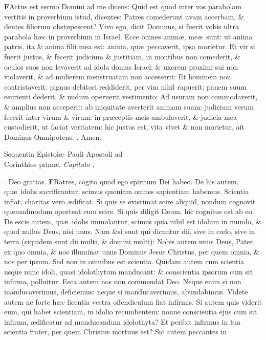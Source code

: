 \documentclass[letter,11pt]{book}
\makeatletter
\DeclareRobustCommand{\Rbar}{\vers@resp{0pt}{R}}
\newcommand{\vers@resp@sym}{\raisebox{0.2ex}{\rotatebox[origin=c]{-20}{$\m@th\rceil$}}}
\newcommand{\vers@resp}[2]{%
  {\ooalign{\hidewidth\kern#1\vers@resp@sym\hidewidth\cr#2\cr}}%
}%
\def\R{\color{Red} \Rbar . \color{black}}
\makeatother
\begin{document}
\begin{multicols*}{2}
\lettrine[lines=2]{\bfseries \color{Red} F}{}Actus est sermo Domini ad me dicens: Quid est quod inter vos parabolam vertitis in proverbium istud, dicentes: Patres comederunt uvam accerbam, \& dentes filiorum obstupescent? Vivo ego, dicit Dominus, si fuerit vobis ultra parabola h\ae c in proverbium in Israel. Ecce omnes anim\ae , me\ae \ sunt: ut anima patris, ita \& anima filii mea est: anima, qu\ae \ peccaverit, ipsa morietur. Et vir si fuerit justus, \& fecerit judicium \& justitiam, in montibus non comederit, \& oculos suos non levaverit ad idola domus Israel: \& uxorem proximi sui non violaverit, \& ad mulierem menstruatam non accesserit: Et hominem non contristaverit: pignus debitori reddiderit, per vim nihil rapuerit: panem suum esurienti dederit, \& nudum operuerit vestimento: Ad usuram non commodaverit, \& amplius non acceperit: ab iniquitate averterit animam suam: judicium verum fecerit inter virum \& virum: in pr\ae ceptis meis ambulaverit, \& judicia mea custodierit, ut faciat veritatem: hic justus est, vita vivet \& non morietur, ait Dominus Omnipotens. \R Amen.
\vspace{-.5em} \begin{center} {\color{Red} S}equentia Epistol\ae \ Pauli Apostoli ad \\ Corinthios prim\ae . \itshape Capitulo . \color{black} \end{center} \vspace{-.5em}
\par \noindent \R Deo gratias.
\lettrine[lines=2]{\bfseries \color{Red} F}{}Ratres, cogito quod ego spiritum Dei habeo. De his autem, qu\ae \ idolis sacrificantur, scimus quoniam omnes sapientiam habemus. Scientia inflat, charitas vero \ae dificat. Si quis se existimat scire aliquid, nondum cognovit quemadmodum oporteat eum scire. Si quis diligit Deum, hic cognitus est ab eo. De escis autem, qu\ae \ idolis immolantur, scimus quia nihil est idolum in mundo, \& quod nullus Deus, nisi unus. Nam \&si sunt qui dicuntur dii, sive in c\oe lo, sive in terra (siquidem sunt dii multi, \& domini multi): Nobis autem unus Deus, Pater, ex quo omnia, \& nos illuminat unus Dominus Jesus Christus, per quem omnia, \& nos per ipsum. Sed non in omnibus est scientia. Quidam autem cum scientia usque nunc idoli, quasi idolothytum manducant: \& conscientia ipsorum cum sit infirma, polluitur. Esca autem nos non commendat Deo. Neque enim si non manducaverimus, deficiemus: neque si manducaverimus, abundabimus. Videte autem ne forte h\ae c licentia vestra offendiculum fiat infirmis. Si autem quis viderit eum, qui habet scientiam, in idolio recumbentem: nonne conscientia ejus cum sit infirma, \ae dificatur ad manducandum idolothyta? Et peribit infirmus in tua scientia frater, per quem Christus mortuus est? Sic autem peccantes in

\end{multicols*}
\end{document}
